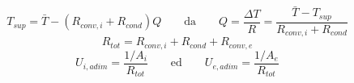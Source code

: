 \documentclass[a4paper,10pt]{article}                                                                                       %
\begin{document}
\vspace{3mm}                                                                                                                %
\begin{equation}                                                                                                            %
  \label{eqn:surf_temp}                                                                                                     %
  T_{sup} = \bar{T}-(R_{conv,i}+R_{cond})Q                                                                                  %
  \qquad\text{da}\qquad                                                                                                     %
  Q = \frac{\Delta{T}}{R} = \frac{\bar{T}-T_{sup}}{R_{conv,i}+R_{cond}}                                                     %
\end{equation}                                                                                                              %
\vspace{3mm}                                                                                                                %
\begin{equation}                                                                                                            %
  \label{eqn:tot_r}                                                                                                         %
  R_{tot} = R_{conv,i}+R_{cond}+R_{conv,e}                                                                                  %
\end{equation}                                                                                                              %
\vspace{3mm}                                                                                                                %
\begin{equation}                                                                                                            %
  \label{eqn:ohtc}                                                                                                          %
  U_{i,adim} = \frac{1/A_i}{R_{tot}}                                                                                        %
  \qquad\text{ed}\qquad                                                                                                     %
  U_{e,adim} = \frac{1/A_e}{R_{tot}}                                                                                        %
\end{equation}                                                                                                              %
\end{document}
